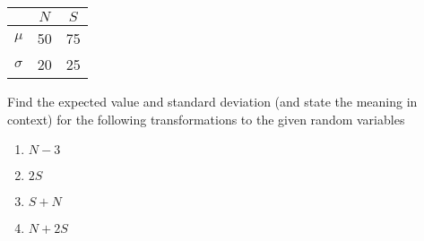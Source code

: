 \begin{enumerate}
\begin{center}
\begin{tabular}{l|cc}
& \(N\) & \(S\) \\ \hline
\(\mu\) & 50 & 75 \\
\(\sigma\) & 20 & 25	
\end{tabular}
\end{center}

Find the expected value and standard deviation (and state the meaning in context) for the following transformations to the given random variables

\begin{enumerate}
\item  \(N-3\)
\item  \(2S\)	
\item  \(S+N\)		
\item  \(N+2S\)
\end{enumerate}
\end{enumerate}